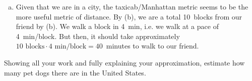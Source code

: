 \documentclass[12pt,letterpaper]{exam}
\begin{document}
\begin{questions}
{\begin{enumerate}[(a)]
\item Given that we are in a city, the taxicab/Manhattan metric seems to be the more useful metric of distance. By (b), we are a total 10~blocks from our friend by (b). We walk a block in 4~min, i.e. we walk at a pace of 4~min/block. But then, it should take approximately $10 \text{ blocks} \cdot 4 \text{ min}/\text{block}= 40$~minutes to walk to our friend. 
\end{enumerate}
}



\newpage
\question[10] Showing all your work and fully explaining your approximation, estimate how many pet dogs there are in the United States. \pspace



\end{questions}
\end{document}

